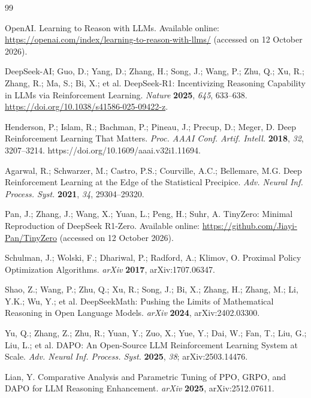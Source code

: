 \begin{thebibliography}{99}

 OpenAI. Learning to Reason with LLMs. Available online: \url{https://openai.com/index/learning-to-reason-with-llms/} (accessed on 12 October 2026).

 DeepSeek-AI; Guo, D.; Yang, D.; Zhang, H.; Song, J.; Wang, P.; Zhu, Q.; Xu, R.; Zhang, R.; Ma, S.; Bi, X.; et al. DeepSeek-R1: Incentivizing Reasoning Capability in LLMs via Reinforcement Learning. \emph{Nature} \textbf{2025}, \emph{645}, 633--638. \url{https://doi.org/10.1038/s41586-025-09422-z}.

 Henderson, P.; Islam, R.; Bachman, P.; Pineau, J.; Precup, D.; Meger, D. Deep Reinforcement Learning That Matters. \emph{Proc. AAAI Conf. Artif. Intell.} \textbf{2018}, \emph{32}, 3207--3214. https://doi.org/10.1609/aaai.v32i1.11694.

 Agarwal, R.; Schwarzer, M.; Castro, P.S.; Courville, A.C.; Bellemare, M.G. Deep Reinforcement Learning at the Edge of the Statistical Precipice. \emph{Adv. Neural Inf. Process. Syst.} \textbf{2021}, \emph{34}, 29304--29320.

 Pan, J.; Zhang, J.; Wang, X.; Yuan, L.; Peng, H.; Suhr, A. TinyZero: Minimal Reproduction of DeepSeek R1-Zero. Available online: \url{https://github.com/Jiayi-Pan/TinyZero} (accessed on 12 October 2026).

 Schulman, J.; Wolski, F.; Dhariwal, P.; Radford, A.; Klimov, O. Proximal Policy Optimization Algorithms. \emph{arXiv} \textbf{2017}, arXiv:1707.06347.

 Shao, Z.; Wang, P.; Zhu, Q.; Xu, R.; Song, J.; Bi, X.; Zhang, H.; Zhang, M.; Li, Y.K.; Wu, Y.; et al. DeepSeekMath: Pushing the Limits of Mathematical Reasoning in Open Language Models. \emph{arXiv} \textbf{2024}, arXiv:2402.03300.

 Yu, Q.; Zhang, Z.; Zhu, R.; Yuan, Y.; Zuo, X.; Yue, Y.; Dai, W.; Fan, T.; Liu, G.; Liu, L.; et al. DAPO: An Open-Source LLM Reinforcement Learning System at Scale. \emph{Adv. Neural Inf. Process. Syst.} \textbf{2025}, \emph{38}; arXiv:2503.14476.

 Lian, Y. Comparative Analysis and Parametric Tuning of PPO, GRPO, and DAPO for LLM Reasoning Enhancement. \emph{arXiv} \textbf{2025}, arXiv:2512.07611.


\end{thebibliography}
